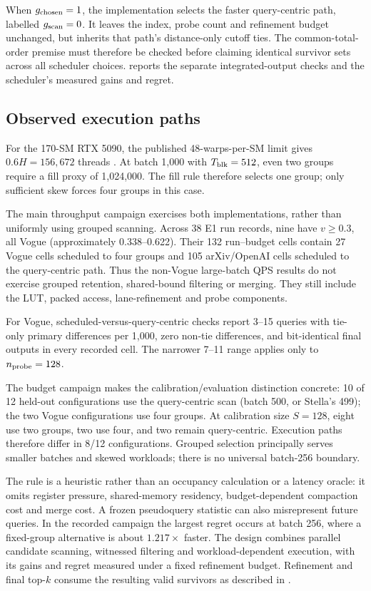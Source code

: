 When $g_{\rm chosen}=1$, the implementation selects the faster
query-centric path, labelled $g_{\mathrm{scan}}=0$. It leaves the index, probe count
and refinement budget unchanged, but inherits that path's distance-only
cutoff ties. The common-total-order premise must therefore be checked
before claiming identical survivor sets across all scheduler choices.
 reports the separate integrated-output checks and the
scheduler's measured gains and regret.

\subsection{Observed execution paths}

For the 170-SM RTX 5090, the published 48-warps-per-SM limit gives
$0.6H=156{,}672$ threads \cite{blackwell_tuning}. At batch 1,000 with
$T_{\rm blk}=512$, even two groups require a fill proxy of 1,024,000.
The fill rule therefore selects one group; only sufficient skew forces
four groups in this case.

The main throughput campaign exercises both implementations, rather than
uniformly using grouped scanning. Across 38 E1 run records, nine have
$v\geq0.3$, all Vogue (approximately 0.338--0.622). Their 132
run--budget cells contain 27 Vogue cells scheduled to four groups and
105 arXiv/OpenAI cells scheduled to the query-centric path. Thus the
non-Vogue large-batch QPS results do not exercise grouped retention,
shared-bound filtering or merging. They still include the LUT, packed
access, lane-refinement and probe components.

For Vogue, scheduled-versus-query-centric checks report 3--15 queries
with tie-only primary differences per 1,000, zero non-tie differences,
and bit-identical final outputs in every recorded cell. The narrower
7--11 range applies only to $n_{\rm probe}=128$.

The budget campaign makes the calibration/evaluation distinction
concrete: 10 of 12 held-out configurations use the query-centric scan
(batch 500, or Stella's 499); the two Vogue configurations use four
groups. At calibration size $S=128$, eight use two groups, two use four,
and two remain query-centric. Execution paths therefore differ in
8/12 configurations. Grouped selection principally serves smaller
batches and skewed workloads; there is no universal batch-256 boundary.

The rule is a heuristic rather than an occupancy calculation or a
latency oracle: it omits register pressure, shared-memory residency,
budget-dependent compaction cost and merge cost. A frozen pseudoquery
statistic can also misrepresent future queries. In the recorded campaign
the largest regret occurs at batch 256, where a fixed-group alternative
is about $1.217\times$ faster. The design combines parallel candidate scanning, witnessed filtering
and workload-dependent execution, with its gains and regret measured
under a fixed refinement budget. Refinement and final top-$k$ consume
the resulting valid survivors as described in .
